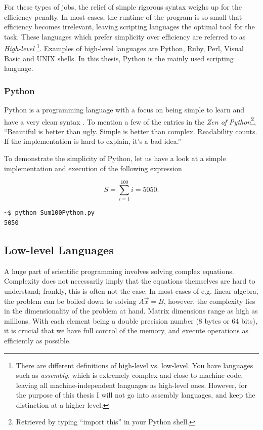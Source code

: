 For these types of jobs, the relief of simple rigorous syntax weighs up for the efficiency penalty. In most cases, the runtime of the program is so small that efficiency becomes irrelevant, leaving scripting languages the optimal tool for the task. These languages which prefer simplicity over efficiency are referred to as \textit{High-level} \footnote{There are different definitions of high-level vs. low-level. You have languages such as \textit{assembly}, which is extremely complex and close to machine code, leaving all machine-independent languages as high-level ones. However, for the purpose of this thesis I will not go into assembly languages, and keep the distinction at a higher level.}. Examples of high-level languages are Python, Ruby, Perl, Visual Basic and UNIX shells. In this thesis, Python is the mainly used scripting language.   

\subsubsection{Python}
\label{sec:Python}

Python is a programming language with a focus on being simple to learn and have a very clean syntax \cite{inf1100, inf3331}. To mention a few of the entries in the \textit{Zen of Python}\footnote{Retrieved by typing ``import this'' in your Python shell.}, ``Beautiful is better than ugly. Simple is better than complex. Readability counts. If the implementation is hard to explain, it's a bad idea.''

To demonstrate the simplicity of Python, let us have a look at a simple implementation and execution of the following expression

\[
 S = \sum_{i=1}^{100} i = 5050.  \label{eq:sum100}
\]




\begin{verbatim}
~$ python Sum100Python.py 
5050
\end{verbatim}




\subsection{Low-level Languages}
\label{sec:lowlevel}

A huge part of scientific programming involves solving complex equations. Complexity does not necessarily imply that the equations themselves are hard to understand; frankly, this is often not the case. In most cases of e.g. linear algebra, the problem can be boiled down to solving $A\vec x = B$, however, the complexity lies in the dimensionality of the problem at hand. Matrix dimensions range as high as millions. With each element being a double precision number (8 bytes or 64 bits), it is crucial that we have full control of the memory, and execute operations as efficiently as possible. 

